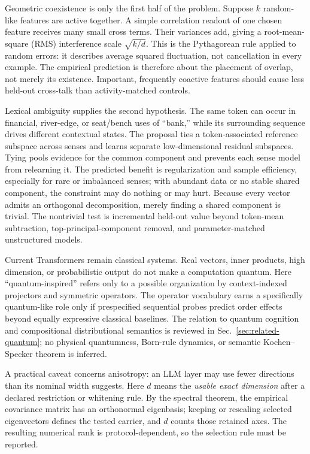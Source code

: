 \documentclass[
  aps,
  reprint,
  superscriptaddress,
  floatfix,
  nofootinbib,
  longbibliography
]{revtex4-2}
\begin{document}
Geometric coexistence is only the first half of the problem.  Suppose $k$
random-like features are active together.  A simple correlation readout of one
chosen feature receives many small cross terms.  Their variances add, giving a
root-mean-square (RMS) interference scale $\sqrt{k/d}$.  This is the
Pythagorean rule applied to random errors: it describes average squared
fluctuation, not cancellation in every example.  The empirical prediction is
therefore about the placement of overlap, not merely its existence.  Important,
frequently coactive features should cause less held-out cross-talk than
activity-matched controls.

Lexical ambiguity supplies the second hypothesis.  The same token can occur in
financial, river-edge, or seat/bench uses of ``bank,'' while its surrounding
sequence drives different contextual states.  The proposal ties a
token-associated reference subspace across senses and learns separate
low-dimensional residual subspaces.  Tying pools evidence for the common
component and prevents each sense model from relearning it.  The predicted
benefit is regularization and sample efficiency, especially for rare or
imbalanced senses; with abundant data or no stable shared component, the
constraint may do nothing or may hurt.  Because every vector admits an
orthogonal decomposition, merely finding a shared component is trivial.  The
nontrivial test is incremental held-out value beyond token-mean subtraction,
top-principal-component removal, and parameter-matched unstructured models.

Current Transformers remain classical systems.  Real vectors, inner products,
high dimension, or probabilistic output do not make a computation quantum.
Here ``quantum-inspired'' refers only to a possible organization by
context-indexed projectors and symmetric operators.  The operator vocabulary
earns a specifically quantum-like role only if prespecified sequential probes
predict order effects beyond equally expressive classical baselines.  The
relation to quantum cognition and compositional distributional semantics is
reviewed in Sec.~\ref{sec:related-quantum}; no physical quantumness, Born-rule
dynamics, or semantic Kochen--Specker theorem is inferred.

A practical caveat concerns anisotropy: an LLM layer may use fewer directions
than its nominal width suggests.  Here $d$ means the \emph{usable exact
dimension} after a declared restriction or whitening rule.  By the spectral
theorem, the empirical covariance matrix has an orthonormal eigenbasis; keeping
or rescaling selected eigenvectors defines the tested carrier, and $d$ counts
those retained axes.  The resulting numerical rank is protocol-dependent, so
the selection rule must be reported.
\end{document}
